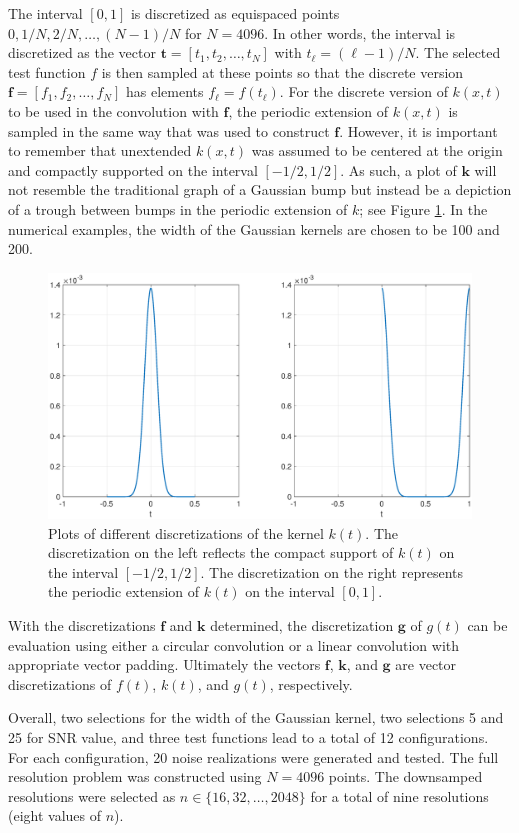 \documentclass[12pt]{article}
\newcommand{\gVec}{\mathbf{g}}	%
\newcommand{\kVec}{\mathbf{k}}	%
\newcommand{\fVec}{\mathbf{f}}	%
\newcommand{\tVec}{\mathbf{t}}	%
\begin{document}
The interval $[0,1]$ is discretized as equispaced points $0, 1/N, 2/N, \ldots, (N-1)/N$ for $N = 4096$. In other words, the interval is discretized as the vector $\tVec = [t_1,t_2,\ldots,t_N]$ with $t_\ell = (\ell-1)/N$. The selected test function $f$ is then sampled at these points so that the discrete version $\fVec = [f_1,f_2,\ldots,f_N]$ has elements $f_\ell = f(t_\ell)$. For the discrete version of $k(x,t)$ to be used in the convolution with $\fVec$, the periodic extension of $k(x,t)$ is sampled in the same way that was used to construct $\fVec$. However, it is important to remember that unextended $k(x,t)$ was assumed to be centered at the origin and compactly supported on the interval $[-1/2,1/2]$. As such, a plot of $\kVec$ will not resemble the traditional graph of a Gaussian bump but instead be a depiction of a trough between bumps in the periodic extension of $k$; see Figure \ref{RegAndTroughGaussian}. In the numerical examples, the width of the Gaussian kernels are chosen to be 100 and 200.  \par

\begin{figure}
	\centerline{\includegraphics[scale = 0.45]{Figures/RegAndTroughGaussian.eps}}
\caption{Plots of different discretizations of the kernel $k(t)$. The discretization on the left reflects the compact support of $k(t)$ on the interval $[-1/2,1/2]$. The discretization on the right represents the periodic extension of $k(t)$ on the interval $[0,1]$.}
\label{RegAndTroughGaussian}
\end{figure}

With the discretizations $\fVec$ and $\kVec$ determined, the discretization $\gVec$ of $g(t)$ can be evaluation using either a circular convolution or a linear convolution with appropriate vector padding. Ultimately the vectors $\fVec$, $\kVec$, and $\gVec$ are vector discretizations of $f(t)$, $k(t)$, and $g(t)$, respectively. \par
Overall, two selections for the width of the Gaussian kernel, two selections 5 and 25 for SNR value, and three test functions lead to a total of 12 configurations. For each configuration, 20 noise realizations were generated and tested. The full resolution problem was constructed using $N = 4096$ points. The downsamped resolutions were selected as $n \in \{16,32,\ldots,2048\}$ for a total of nine resolutions (eight values of $n$).
\end{document}
